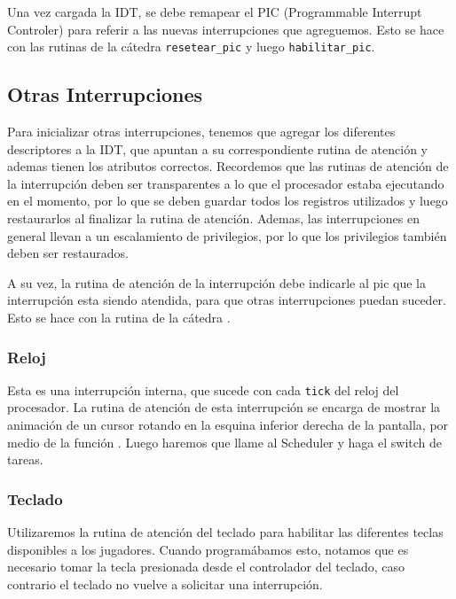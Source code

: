 Una vez cargada la IDT, se debe remapear el PIC (Programmable Interrupt Controler) para referir a las nuevas interrupciones que agreguemos. Esto se hace con las rutinas de la cátedra \texttt{resetear\_pic} y luego \texttt{habilitar\_pic}.

\pagebreak

\subsection{Otras Interrupciones}

Para inicializar otras interrupciones, tenemos que agregar los diferentes descriptores a la IDT, que apuntan a su correspondiente rutina de atención y ademas tienen los atributos correctos. Recordemos que las rutinas de atención de la interrupción deben ser transparentes a lo que el procesador estaba ejecutando en el momento, por lo que se deben guardar todos los registros utilizados y luego restaurarlos al finalizar la rutina de atención. Ademas, las interrupciones en general llevan a un escalamiento de privilegios, por lo que los privilegios también deben ser restaurados.

A su vez, la rutina de atención de la interrupción debe indicarle al pic que la interrupción esta siendo atendida, para que otras interrupciones puedan suceder. Esto se hace con la rutina de la cátedra .

\subsubsection{Reloj}

Esta es una interrupción interna, que sucede con cada \texttt{tick} del reloj del procesador. La rutina de atención de esta interrupción se encarga de mostrar la animación de un cursor rotando en la esquina inferior derecha de la pantalla, por medio de la función . Luego haremos que llame al Scheduler y haga el switch de tareas.

\subsubsection{Teclado}
Utilizaremos la rutina de atención del teclado para habilitar las diferentes teclas disponibles a los jugadores. Cuando programábamos esto, notamos que es necesario tomar la tecla presionada desde el controlador del teclado, caso contrario el teclado no vuelve a solicitar una interrupción.


